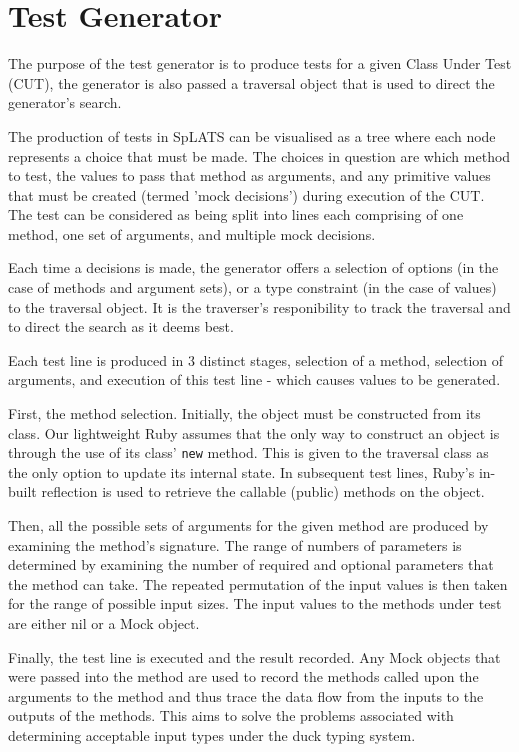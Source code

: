   \section{Test Generator}
    The purpose of the test generator is to produce tests for a given Class
Under Test (CUT), the generator is also passed a traversal object that is used
to direct the generator's search.

    The production of tests in SpLATS can be visualised as a tree where each
node represents a choice that must be made. The choices in question are which
method to test, the values to pass that method as arguments, and any primitive
values that must be created (termed 'mock decisions') during execution of the CUT.
    The test can be considered as being split into lines each comprising of one
method, one set of arguments, and multiple mock decisions.


    Each time a decisions is made, the generator offers a selection of options
(in the case of methods and argument sets), or a type constraint (in the case of
values) to the traversal object. It is the traverser's responibility to track
the traversal and to direct the search as it deems best.

    Each test line is produced in 3 distinct stages, selection of a method,
selection of arguments, and execution of this test line - which causes values to
be generated.

    First, the method selection. Initially, the object must be constructed from
its class. Our lightweight Ruby assumes that the only way to construct an
object is through the use of its class' \texttt{new} method. This is given to
the traversal class as the only option to update its internal state. In
subsequent test lines, Ruby's in-built reflection is used to retrieve the
callable (public) methods on the object.

    Then, all the possible sets of arguments for the given method are produced
by examining the method's signature. The range of numbers of parameters is
determined by examining the number of required and optional parameters that the
method can take. The repeated permutation of the input values is then taken
for the range of possible input sizes. The input values to the methods under
test are either nil or a Mock object.

    Finally, the test line is executed and the result recorded. Any Mock objects
that were passed into the method are used to record the methods called upon the
arguments to the method and thus trace the data flow from the inputs to the
outputs of the methods. This aims to solve the problems associated with
determining acceptable input types under the duck typing system.

